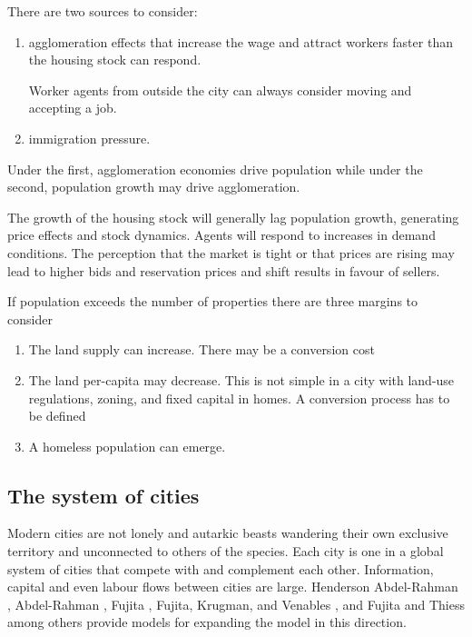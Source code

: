 There are two sources to consider: 
\begin{enumerate}
\item agglomeration effects that increase the wage and attract workers faster than the housing stock can respond. 

Worker agents from outside the city can always consider moving and accepting a job. 
\item immigration pressure.
\end{enumerate}
Under the  first, agglomeration economies drive population while under the second, population growth may drive agglomeration.

The growth of the housing stock will generally lag population growth, generating price effects and stock dynamics.
Agents will respond to increases in demand conditions. The perception that the market is tight or that prices are rising may lead to higher bids and reservation prices and shift results in favour of sellers.  




If population exceeds the number of properties there are three margins to consider
	\begin{enumerate}
		\item The land supply can increase. There may be a conversion cost
		\item The land per-capita may decrease. This is not simple in a city with land-use regulations, zoning, and fixed capital in homes. A conversion process has to be defined
		\item A homeless population can emerge. 
	\end{enumerate}



\subsection{The system of cities}
Modern cities are not lonely and autarkic  beasts wandering their own exclusive territory and unconnected to others of the species. Each city is one in a global system of cities that compete with and complement each other. Information, capital and even labour flows between cities are large. Henderson Abdel-Rahman \cite{Henderson1972Sizes}, Abdel-Rahman \cite{abdel-rahmanAgglomerationEconomiesTypes1990}, Fujita \cite{fujitaMonopolisticCompetitionModel1988}, Fujita, Krugman, and Venables \cite{fujitaSpatialEconomyCities1999}, and Fujita and Thiess \cite{fujitaEconomicsAgglomeration1996} among others provide models for expanding the model in this direction.




